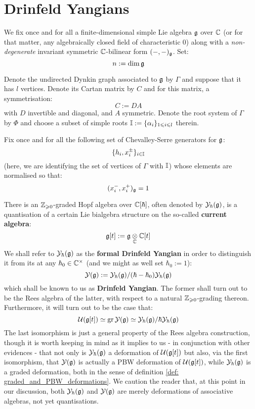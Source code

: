 \section{Drinfeld Yangians}
    \begin{convention} \label{conv: a_fixed_semi_simple_lie_algebra}
        We fix once and for all a finite-dimensional simple Lie algebra $\mathfrak{g}$ over $\mathbb{C}$ (or for that matter, any algebraically closed field of characteristic $0$) along with a \textit{non-degenerate} invariant symmetric $\mathbb{C}$-bilinear form $(-, -)_{\mathfrak{g}}$. Set:
            $$n := \dim \mathfrak{g}$$
            
        Denote the undirected Dynkin graph associated to $\mathfrak{g}$ by $\Gamma$ and suppose that it has $l$ vertices. Denote its Cartan matrix by $C$ and for this matrix, a symmetrisation:
            $$C := DA$$
        with $D$ invertible and diagonal, and $A$ symmetric. Denote the root system of $\Gamma$ by $\Phi$ and choose a subset of simple roots $\mathbb{I} := \{\alpha_i\}_{1 \leqslant i \leqslant l}$ therein. 
        
        Fix once and for all the following set of Chevalley-Serre generators for $\mathfrak{g}$:
            $$\{h_i, x_i^{\pm}\}_{i \in \mathbb{I}}$$
        (here, we are identifying the set of vertices of $\Gamma$ with $\mathbb{I}$) whose elements are normalised so that:
            $$(x_i^-, x_i^+)_{\mathfrak{g}} = 1$$
    \end{convention}

    There is an $\mathbb{Z}_{\geqslant 0}$-graded Hopf algebra over $\mathbb{C}[\hbar]$, often denoted by $\mathcal{Y}_{\hbar}(\mathfrak{g})$, is a quantisation of a certain Lie bialgebra structure on the so-called \textbf{current algebra}:
        $$\g[t] := \g \tensor_{\bbC} \bbC[t]$$
    We shall refer to $\mathcal{Y}_{\hbar}(\mathfrak{g})$ as the \textbf{formal Drinfeld Yangian} in order to distinguish it from its  at any $\hbar_0 \in \bbC^{\x}$ (and we might as well set $\hbar_0 := 1$):
        $$\mathcal{Y}(\mathfrak{g}) := \mathcal{Y}_{\hbar}(\mathfrak{g})/(\hbar - \hbar_0)\mathcal{Y}_{\hbar}(\mathfrak{g})$$
    which shall be known to us as  \textbf{Drinfeld Yangian}. The former shall turn out to be the Rees algebra of the latter, with respect to a natural $\mathbb{Z}_{\geqslant 0}$-grading thereon. Furthermore, it will turn out to be the case that:
        $$\mathcal{U}( \mathfrak{g}[t] ) \simeq \operatorname{gr} \mathcal{Y}(\mathfrak{g}) \simeq \mathcal{Y}_{\hbar}(\mathfrak{g})/\hbar\mathcal{Y}_{\hbar}(\mathfrak{g})$$
    The last isomorphism is just a general property of the Rees algebra construction, though it is worth keeping in mind as it implies to us - in conjunction with other evidences - that not only is $\mathcal{Y}_{\hbar}(\mathfrak{g})$ a deformation of $\mathcal{U}( \mathfrak{g}[t] )$ but also, via the first isomorphism, that $\mathcal{Y}(\mathfrak{g})$ is actually a PBW deformation of $\mathcal{U}( \mathfrak{g}[t] )$, while $\mathcal{Y}_{\hbar}(\mathfrak{g})$ is a graded deformation, both in the sense of definition \ref{def: graded_and_PBW_deformations}. We caution the reader that, at this point in our discussion, both $\mathcal{Y}_{\hbar}(\mathfrak{g})$ and $\mathcal{Y}(\mathfrak{g})$ are merely deformations of associative algebras, not yet quantisations. 

